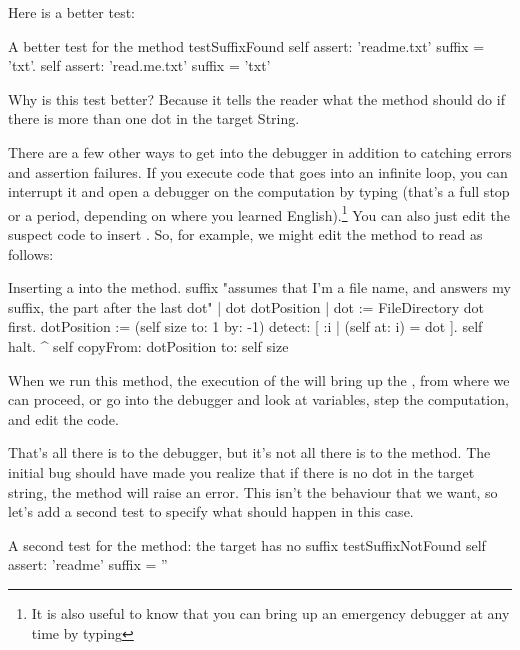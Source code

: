 \documentclass[a4paper,10pt,twoside]{book}
\begin{document}
Here is a better test:

\begin{method}[testSuffix2]{A better test for the  method}
testSuffixFound
	self assert: 'readme.txt' suffix = 'txt'.
	self assert: 'read.me.txt' suffix = 'txt'
\end{method}
\noindent
Why is this test better?  Because it tells the reader what the method should do if there is more than one dot in the target String.

There are a few other ways to get into the debugger in addition to catching errors and assertion failures.
If you execute code that goes into an infinite loop, you can interrupt it and open a debugger on the computation by typing  (that's a full stop or a period, depending  on where you learned English).\footnote{It is also useful to know that you can bring up an emergency debugger at any time by typing }
You can also just edit the suspect code to insert .
So, for example, we might edit the  method to read as follows:

\needspace{11ex}
\begin{method}[suffix]{Inserting a  into the  method.}
suffix
	"assumes that I'm a file name, and answers my suffix, the part after the last dot"
	| dot dotPosition |
	dot := FileDirectory dot first.
	dotPosition := (self size to: 1 by: -1) detect: [ :i | (self at: i) = dot ].
	self halt.
	^ self copyFrom: dotPosition to: self size 
\end{method}

When we run this method, the execution of the  will bring up the , from where we can proceed, or go into the debugger and look at variables, step the computation, and edit the code.

That's all there is to the debugger, but it's not all there is to the  method.  
The initial bug should have made you realize that if there is no dot in the target string, the  method will raise an error.  
This isn't the behaviour that we want, so let's add a second test to specify what should happen in this case.

\begin{method}[testNoSuffix]{A second test for the  method: the target has no suffix}
testSuffixNotFound
	self assert: 'readme' suffix = ''
\end{method}
\end{document}
